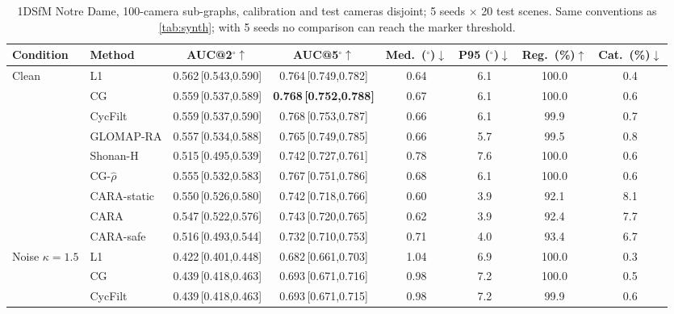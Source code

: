 \begin{table}[!htbp]
\centering
\caption{1DSfM Notre Dame, 100-camera sub-graphs, calibration and test cameras disjoint; 5 seeds $\times$ 20 test scenes. Same conventions as \cref{tab:synth}; with 5 seeds no comparison can reach the marker threshold.}
\label{tab:real}
\setlength{\tabcolsep}{3.2pt}
\footnotesize
\begin{adjustbox}{max width=\textwidth,max totalheight=0.85\textheight}\begin{tabular}{llcccccc}
\toprule
Condition & Method & AUC@2$^\circ\uparrow$ & AUC@5$^\circ\uparrow$ & Med.\ ($^\circ$)$\downarrow$ & P95 ($^\circ$)$\downarrow$ & Reg.\ (\%)$\uparrow$ & Cat.\ (\%)$\downarrow$\\
\midrule
Clean & L1 & 0.562\,{\scriptsize[0.543,0.590]} & 0.764\,{\scriptsize[0.749,0.782]} & 0.64 & 6.1 & 100.0 & 0.4\\
 & CG & 0.559\,{\scriptsize[0.537,0.589]} & \textbf{0.768\,{\scriptsize[0.752,0.788]}} & 0.67 & 6.1 & 100.0 & 0.6\\
 & CycFilt & 0.559\,{\scriptsize[0.537,0.590]} & 0.768\,{\scriptsize[0.753,0.787]} & 0.66 & 6.1 & 99.9 & 0.7\\
 & GLOMAP-RA & 0.557\,{\scriptsize[0.534,0.588]} & 0.765\,{\scriptsize[0.749,0.785]} & 0.66 & 5.7 & 99.5 & 0.8\\
 & Shonan-H & 0.515\,{\scriptsize[0.495,0.539]} & 0.742\,{\scriptsize[0.727,0.761]} & 0.78 & 7.6 & 100.0 & 0.6\\
 & CG-$\hat\rho$ & 0.555\,{\scriptsize[0.532,0.583]} & 0.767\,{\scriptsize[0.751,0.786]} & 0.68 & 6.1 & 100.0 & 0.6\\
 & CARA-static & 0.550\,{\scriptsize[0.526,0.580]} & 0.742\,{\scriptsize[0.718,0.766]} & 0.60 & 3.9 & 92.1 & 8.1\\
 & CARA & 0.547\,{\scriptsize[0.522,0.576]} & 0.743\,{\scriptsize[0.720,0.765]} & 0.62 & 3.9 & 92.4 & 7.7\\
 & CARA-safe & 0.516\,{\scriptsize[0.493,0.544]} & 0.732\,{\scriptsize[0.710,0.753]} & 0.71 & 4.0 & 93.4 & 6.7\\
\midrule
Noise $\kappa{=}1.5$ & L1 & 0.422\,{\scriptsize[0.401,0.448]} & 0.682\,{\scriptsize[0.661,0.703]} & 1.04 & 6.9 & 100.0 & 0.3\\
 & CG & 0.439\,{\scriptsize[0.418,0.463]} & 0.693\,{\scriptsize[0.671,0.716]} & 0.98 & 7.2 & 100.0 & 0.5\\
 & CycFilt & 0.439\,{\scriptsize[0.418,0.463]} & 0.693\,{\scriptsize[0.671,0.715]} & 0.98 & 7.2 & 99.9 & 0.6\\

\end{tabular}
\end{adjustbox}
\end{table}
